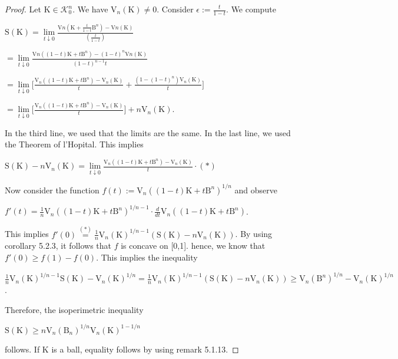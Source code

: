 \documentclass[a4paper]{book}
\numberwithin{theorem}{section}%
\begin{document}
\begin{proof}
    Let $\mathrm{K}\in\mathscr{K}_{0}^{n}$. We have $\mathrm{V}_{n}(\mathrm{K})\neq0$. Consider $\displaystyle \epsilon:=\frac{t}{1-t}$. We compute
    \begin{center}
        $\displaystyle \mathrm{S}(\mathrm{K})=\underset{t\downarrow0}{\lim}\frac{\mathrm{V}{n}(\mathrm{K}+\frac{t}{1-t}\mathrm{B}^{n})-\mathrm{V}{n}(\mathrm{K})}{(\frac{t}{1-t})}$

        $\displaystyle =\underset{t\downarrow0}{\lim}\frac{\mathrm{V}{n}((1-t)\mathrm{K}+t\mathrm{B}^{n})-(1-t)^{n}\mathrm{V}{n}(\mathrm{K})}{(1-t)^{n-1}t}$

        $\displaystyle =\underset{t\downarrow0}{\lim}\Big[\frac{\mathrm{V}_{n}((1-t)\mathrm{K}+t\mathrm{B}^{n})-\mathrm{V}_{n}(\mathrm{K})}{t}+\frac{(1-(1-t)^{n})\mathrm{V}_{n}(\mathrm{K})}{t}\Big]$

        $\displaystyle =\underset{t\downarrow0}{\lim}\Big[\frac{\mathrm{V}_{n}((1-t)\mathrm{K}+t\mathrm{B}^{n})-\mathrm{V}_{n}(\mathrm{K})}{t}\Big]+n\mathrm{V}_{n}(\mathrm{K})$.
    \end{center}
    In the third line, we used that the limits are the same. In the last line, we used the Theorem of l'Hopital. This implies
    \begin{center}
        $\displaystyle \mathrm{S}(\mathrm{K})-n\mathrm{V}_{n}(\mathrm{K})=\underset{t\downarrow0}{\lim}\frac{\mathrm{V}_{n}((1-t)\mathrm{K}+t\mathrm{B}^{n})-\mathrm{V}_{n}(\mathrm{K})}{t}\cdot(\ast)$
    \end{center}
    Now consider the function $f(t):=\mathrm{V}_{n}((1-t)\mathrm{K}+t\mathrm{B}^{n})^{1/n}$ and observe
    \begin{center}
        $f'(t)=\frac{1}{n}\mathrm{V}_{n}((1-t)\mathrm{K}+t\mathrm{B}^{n})^{1/{n-1}}\cdot\frac{d}{dt}\mathrm{V}_{n}((1-t)\mathrm{K}+t\mathrm{B}^{n})$.
    \end{center}
    This implies $f'(0)\overset{(\ast)}{=}\frac{1}{n}\mathrm{V}_{n}(\mathrm{K})^{1/{n-1}}(\mathrm{S}(\mathrm{K})-n\mathrm{V}_{n}(\mathrm{K}))$. By using corollary 5.2.3, it follows that $f$ is concave on [0,1]. hence, we know that $f'(0)\geq f(1)-f(0)$. This implies the inequality
    \begin{center}
        $\displaystyle \frac{1}{n}\mathrm{V}_{n}(\mathrm{K})^{1/{n-1}}\mathrm{S}(\mathrm{K})-\mathrm{V}_{n}(\mathrm{K})^{1/n}=\frac{1}{n}\mathrm{V}_{n}(\mathrm{K})^{1/{n-1}}(\mathrm{S}(\mathrm{K})-n\mathrm{V}_{n}(\mathrm{K}))\geq\mathrm{V}_{n}(\mathrm{B}^{n})^{1/n}-\mathrm{V}_{n}(\mathrm{K})^{1/n}$.
    \end{center}
    Therefore, the isoperimetric inequality
    \begin{center}
        $\displaystyle \mathrm{S}(\mathrm{K})\geq n\mathrm{V}_{n}(\mathrm{B}_{n})^{1/n}\mathrm{V}_{n}(\mathrm{K})^{1-1/n}$
    \end{center}
    follows. If $\mathrm{K}$ is a ball, equality follows by using remark 5.1.13.


\end{proof}
\end{document}
